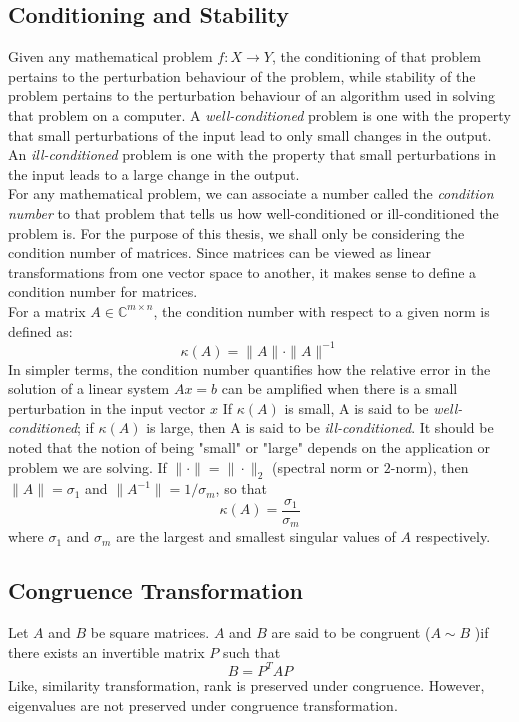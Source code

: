 \subsection{Conditioning and Stability}
Given any mathematical problem $f: X \rightarrow Y$, the conditioning of that problem pertains to the perturbation behaviour of the problem, while stability of the problem pertains to the perturbation behaviour of an algorithm used in solving that problem on a computer. A \textit{well-conditioned} problem is one with the property that small perturbations of the input lead to only small changes in the output. An \textit{ill-conditioned} problem is one with the property that small perturbations in the input leads to a large change in the output.\\
For any mathematical problem, we can associate a number called the \textit{condition number} to that problem that tells us how well-conditioned or ill-conditioned the problem is. For the purpose of this thesis, we shall only be considering the condition number of matrices. Since matrices can be viewed as linear transformations from one vector space to another, it makes sense to define a condition number for matrices.\\
For a matrix $A \in \mathbb{C}^{m\times n}$, the condition number with respect to a given norm is defined as:
\begin{equation}
	\kappa(A) = \|A\| \cdot \|A\|^{-1}
\end{equation}
In simpler terms, the condition number quantifies how the relative error in the solution of a linear system $Ax = b$ can be amplified when there is a small perturbation in the input vector $x$ If $\kappa(A)$ is small, A is said to be \textit{well-conditioned}; if $\kappa(A)$ is large, then A is said to be \textit{ill-conditioned}. It should be noted that the notion of being "small" or "large" depends on the application or problem we are solving. If $\| \cdot\| = \| \cdot \|_2$ (spectral norm or $2$-norm), then $\|A\| = \sigma_1$ and $\| A^{-1} \| = 1/\sigma_m$, so that
\begin{equation}
	\kappa(A) = \frac{\sigma_1}{\sigma_m}
\end{equation}
where $\sigma_1$ and $\sigma_m$ are the largest and smallest singular values of $A$ respectively.
\subsection{Congruence Transformation}
Let $A$ and $B$ be square matrices. $A$ and $B$ are said to be congruent ($A \sim B$ )if there exists an invertible matrix $P$ such that
\begin{equation}
	B = P^TAP
\end{equation}
Like, similarity transformation, rank is preserved under congruence. However, eigenvalues are not preserved under congruence transformation. 
